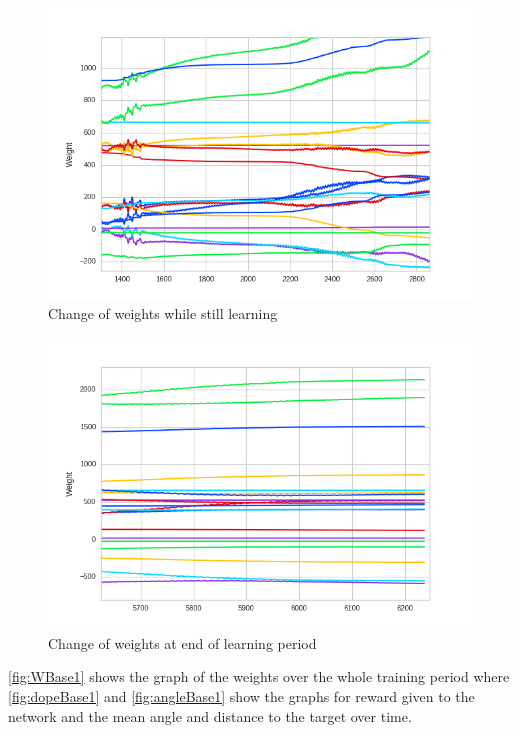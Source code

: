 \begin{figure}[htpb]
  \centering
  \includegraphics[width=\textwidth]{figures/plots/newPlots/base1Training_weights_mid}%
  \caption{Change of weights while still learning }
  \label{fig:midWBase1}
\end{figure}


\begin{figure}[htpb]
  \centering
  \includegraphics[width=\textwidth]{figures/plots/newPlots/base1Training_weights_end}%
  \caption{Change of weights at end of learning period }
  \label{fig:endWBase1}
\end{figure}
\autoref{fig:WBase1} shows the graph of the weights over the whole training period where \autoref{fig:dopeBase1} and \autoref{fig:angleBase1} show the graphs for reward given to the network and the mean angle and distance to the target over time.

